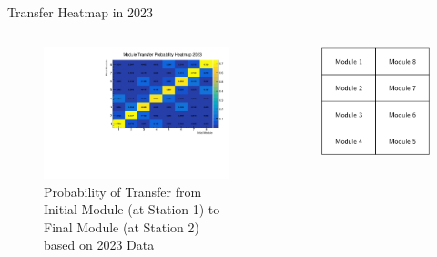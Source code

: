 \begin{frame}{Transfer Heatmap in 2023}
    \begin{columns}
        \begin{column}{0.85\linewidth}
            \begin{figure}
                \includegraphics[width=0.9\linewidth]{./ModuleLevelPlots/st0_module_number vs st1_module_number_prob_2023.pdf}
                \caption{Probability of Transfer from Initial Module (at Station 1) to Final Module (at Station 2) based on 2023 Data}
            \end{figure}
        \end{column}
        \begin{column}{0.2\linewidth}
            \begin{figure}
                \includegraphics[width=\linewidth]{./assets/ModuleThumbnail.png}

\end{figure}
\end{column}
\end{columns}
\end{frame}
